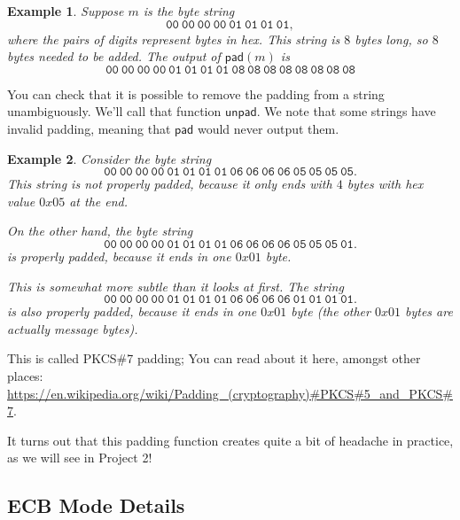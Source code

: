 \documentclass[11pt]{article}
\newtheorem{example}{Example}
\newcommand{\pad}{\mathsf{pad}}
\newcommand{\unpad}{\mathsf{unpad}}
\begin{document}
\begin{example}
    Suppose $m$ is the byte string 
    \[
        \mathtt{00\ 00\ 00\ 00\ 01\ 01\ 01\ 01},
    \]
    where the pairs of digits represent bytes in hex.
    This string is $8$ bytes long, so $8$ bytes needed to be added.
    The output of $\pad(m)$ is
    \[
        \mathtt{00\ 00\ 00\ 00\ 01\ 01\ 01\ 01\ 08\ 08\ 08\ 08\ 08\ 08\ 08\ 08}
    \]
\end{example}
You can check that it is possible to remove the padding from a string
unambiguously. We'll call that function $\unpad$. We note that some strings
have invalid padding, meaning that $\pad$ would never output them.
\begin{example}
    Consider the byte string
    \[
        \mathtt{00\ 00\ 00\ 00\ 01\ 01\ 01\ 01\ 06\ 06\ 06\ 06\ 05\ 05\ 05\ 05}.
    \]
    This string is not properly padded, because it only ends with $4$ bytes
    with hex value $0x05$ at the end.

    On the other hand, the byte string
    \[
        \mathtt{00\ 00\ 00\ 00\ 01\ 01\ 01\ 01\ 06\ 06\ 06\ 06\ 05\ 05\ 05\ 01}.
    \]
    \emph{is} properly padded, because it ends in one $0x01$ byte.

    This is somewhat more subtle than it looks at first. The string
    \[
        \mathtt{00\ 00\ 00\ 00\ 01\ 01\ 01\ 01\ 06\ 06\ 06\ 06\ 01\ 01\ 01\ 01}.
    \]
    is also properly padded, because it ends in one $0x01$ byte (the other
    $0x01$ bytes are actually message bytes).
\end{example}
This is called PKCS\#7 padding; You can read about it here, amongst other
places:
\url{https://en.wikipedia.org/wiki/Padding_(cryptography)#PKCS#5_and_PKCS#7}.

It turns out that this padding function creates quite a bit of headache in
practice, as we will see in Project 2!


\subsection{ECB Mode Details}
\end{document}
